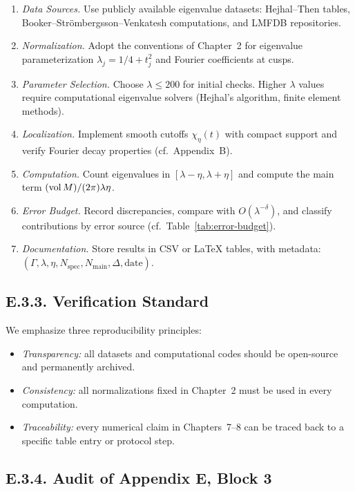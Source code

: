 \begin{enumerate}
  \item \emph{Data Sources.} Use publicly available eigenvalue datasets:
  Hejhal--Then tables, Booker--Strömbergsson--Venkatesh computations,
  and LMFDB repositories.  
  \item \emph{Normalization.} Adopt the conventions of Chapter~2 for
  eigenvalue parameterization $\lambda_j = 1/4 + t_j^2$ and
  Fourier coefficients at cusps.  
  \item \emph{Parameter Selection.} Choose $\lambda \leq 200$
  for initial checks. Higher $\lambda$ values require computational
  eigenvalue solvers (Hejhal’s algorithm, finite element methods).  
  \item \emph{Localization.} Implement smooth cutoffs $\chi_\eta(t)$
  with compact support and verify Fourier decay properties
  (cf.~Appendix~B).  
  \item \emph{Computation.} Count eigenvalues in $[\lambda-\eta,\lambda+\eta]$
  and compute the main term $(\operatorname{vol} M)/(2\pi)\lambda\eta$.  
  \item \emph{Error Budget.} Record discrepancies, compare with
  $O(\lambda^{-\delta})$, and classify contributions by error source
  (cf.~Table~\ref{tab:error-budget}).  
  \item \emph{Documentation.} Store results in CSV or LaTeX tables,
  with metadata: $(\Gamma,\lambda,\eta,N_{\text{spec}},N_{\text{main}},\Delta,\text{date})$.
\end{enumerate}

\medskip
\subsection*{E.3.3. Verification Standard}

We emphasize three reproducibility principles:

\begin{itemize}
  \item \emph{Transparency:} all datasets and computational codes
  should be open-source and permanently archived.  
  \item \emph{Consistency:} all normalizations fixed in Chapter~2
  must be used in every computation.  
  \item \emph{Traceability:} every numerical claim in Chapters~7--8
  can be traced back to a specific table entry or protocol step.  
\end{itemize}

\medskip
\subsection*{E.3.4. Audit of Appendix E, Block 3}

